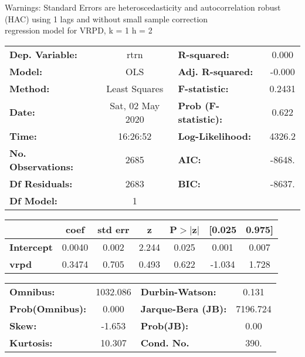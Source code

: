 Warnings: \newline
 [1] Standard Errors are heteroscedasticity and autocorrelation robust (HAC) using 1 lags and without small sample correction\\ 

regression model for VRPD, k = 1 h = 2\begin{center}
\begin{tabular}{lclc}
\toprule
\textbf{Dep. Variable:}    &       rtrn       & \textbf{  R-squared:         } &     0.000   \\
\textbf{Model:}            &       OLS        & \textbf{  Adj. R-squared:    } &    -0.000   \\
\textbf{Method:}           &  Least Squares   & \textbf{  F-statistic:       } &    0.2431   \\
\textbf{Date:}             & Sat, 02 May 2020 & \textbf{  Prob (F-statistic):} &    0.622    \\
\textbf{Time:}             &     16:26:52     & \textbf{  Log-Likelihood:    } &    4326.2   \\
\textbf{No. Observations:} &        2685      & \textbf{  AIC:               } &    -8648.   \\
\textbf{Df Residuals:}     &        2683      & \textbf{  BIC:               } &    -8637.   \\
\textbf{Df Model:}         &           1      & \textbf{                     } &             \\
\bottomrule
\end{tabular}
\begin{tabular}{lcccccc}
                   & \textbf{coef} & \textbf{std err} & \textbf{z} & \textbf{P$> |$z$|$} & \textbf{[0.025} & \textbf{0.975]}  \\
\midrule
\textbf{Intercept} &       0.0040  &        0.002     &     2.244  &         0.025        &        0.001    &        0.007     \\
\textbf{vrpd}      &       0.3474  &        0.705     &     0.493  &         0.622        &       -1.034    &        1.728     \\
\bottomrule
\end{tabular}
\begin{tabular}{lclc}
\textbf{Omnibus:}       & 1032.086 & \textbf{  Durbin-Watson:     } &    0.131  \\
\textbf{Prob(Omnibus):} &   0.000  & \textbf{  Jarque-Bera (JB):  } & 7196.724  \\
\textbf{Skew:}          &  -1.653  & \textbf{  Prob(JB):          } &     0.00  \\
\textbf{Kurtosis:}      &  10.307  & \textbf{  Cond. No.          } &     390.  \\
\bottomrule
\end{tabular}
\end{center}

